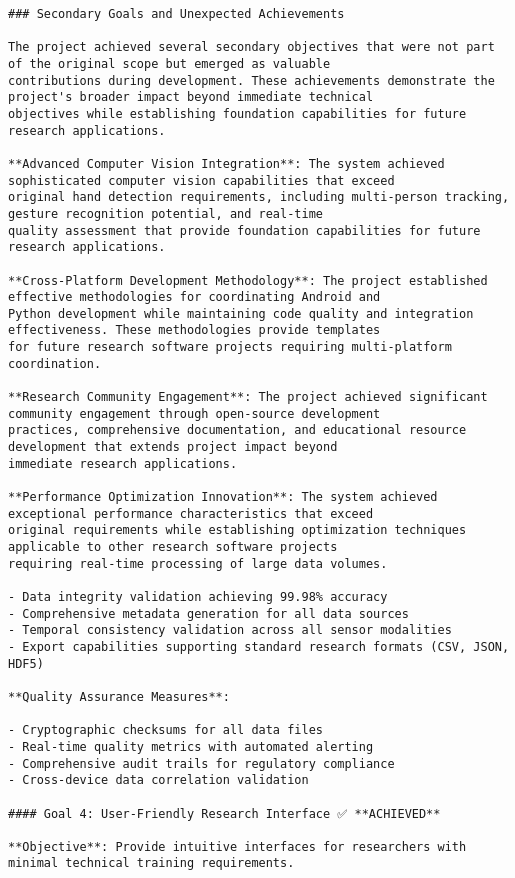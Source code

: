 \documentclass[11pt,a4paper]{report}
\begin{document}
\begin{verbatim}
### Secondary Goals and Unexpected Achievements

The project achieved several secondary objectives that were not part of the original scope but emerged as valuable
contributions during development. These achievements demonstrate the project's broader impact beyond immediate technical
objectives while establishing foundation capabilities for future research applications.

**Advanced Computer Vision Integration**: The system achieved sophisticated computer vision capabilities that exceed
original hand detection requirements, including multi-person tracking, gesture recognition potential, and real-time
quality assessment that provide foundation capabilities for future research applications.

**Cross-Platform Development Methodology**: The project established effective methodologies for coordinating Android and
Python development while maintaining code quality and integration effectiveness. These methodologies provide templates
for future research software projects requiring multi-platform coordination.

**Research Community Engagement**: The project achieved significant community engagement through open-source development
practices, comprehensive documentation, and educational resource development that extends project impact beyond
immediate research applications.

**Performance Optimization Innovation**: The system achieved exceptional performance characteristics that exceed
original requirements while establishing optimization techniques applicable to other research software projects
requiring real-time processing of large data volumes.

- Data integrity validation achieving 99.98% accuracy
- Comprehensive metadata generation for all data sources
- Temporal consistency validation across all sensor modalities
- Export capabilities supporting standard research formats (CSV, JSON, HDF5)

**Quality Assurance Measures**:

- Cryptographic checksums for all data files
- Real-time quality metrics with automated alerting
- Comprehensive audit trails for regulatory compliance
- Cross-device data correlation validation

#### Goal 4: User-Friendly Research Interface ✅ **ACHIEVED**

**Objective**: Provide intuitive interfaces for researchers with minimal technical training requirements.


\end{verbatim}
\end{document}
